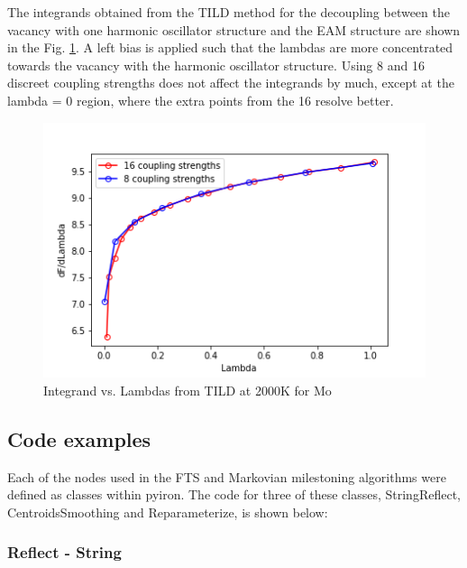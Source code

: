 \documentclass{article}
\begin{document}
The integrands obtained from the TILD method for the decoupling between the vacancy with one harmonic oscillator structure and the EAM structure are shown in the Fig. \ref{fig:25}. A left bias is applied such that the lambdas are more concentrated towards the vacancy with the harmonic oscillator structure. Using 8 and 16 discreet coupling strengths does not affect the integrands by much, except at the lambda = 0 region, where the extra points from the 16 resolve better.

\begin{figure}[!htp]
\centering
\includegraphics[scale=0.65]{lambdas}
\caption{Integrand vs. Lambdas from TILD at 2000K for Mo}
\label{fig:25}
\end{figure}

\subsection{Code examples}

Each of the nodes used in the FTS and Markovian milestoning algorithms were defined as classes within pyiron. The code for three of these classes, StringReflect, CentroidsSmoothing and Reparameterize, is shown below:

\subsubsection{Reflect - String}
\end{document}
